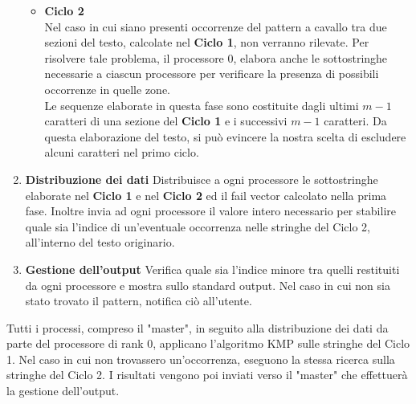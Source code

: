 \begin{enumerate}
{\begin{itemize}
{}
\item{\textbf{Ciclo 2}\\
Nel caso in cui siano presenti occorrenze del pattern a cavallo tra due sezioni del testo, calcolate nel \textbf{Ciclo 1}, non verranno rilevate. Per risolvere tale problema, il processore $0$, elabora anche le sottostringhe necessarie a ciascun processore per verificare la presenza di possibili occorrenze in quelle zone.\\Le sequenze elaborate in questa fase sono costituite dagli ultimi $m-1$ caratteri di una sezione del \textbf{Ciclo 1} e i successivi $m-1$ caratteri. Da questa elaborazione del testo, si può evincere la nostra scelta di escludere alcuni caratteri nel primo ciclo.
\begin{comment}
\begin{figure}[h]
\centering
\texttt{[image: Path]}
\caption{\footnotesize{}}
\label{Esempio_Ciclo2}
\end{figure}
\end{comment}
}
\end{itemize}
}
\item{\textbf{Distribuzione dei dati}
Distribuisce a ogni processore le sottostringhe elaborate nel \textbf{Ciclo 1} e nel \textbf{Ciclo 2} ed il fail vector calcolato nella prima fase. Inoltre invia ad ogni processore il valore intero necessario per stabilire quale sia l'indice di un'eventuale occorrenza nelle stringhe del Ciclo 2, all'interno del testo originario. 
}
\item{\textbf{Gestione dell'output}
Verifica quale sia l'indice minore tra quelli restituiti da ogni processore e mostra sullo standard output. Nel caso in cui non sia stato trovato il pattern, notifica ciò all'utente.
}
\end{enumerate}

Tutti i processi, compreso il "master", in seguito alla distribuzione dei dati da parte del processore di rank 0, applicano l'algoritmo KMP sulle stringhe del Ciclo 1. Nel caso in cui non trovassero un'occorrenza, eseguono la stessa ricerca sulla stringhe del Ciclo 2. I risultati vengono poi inviati verso il "master" che effettuerà la gestione dell'output.